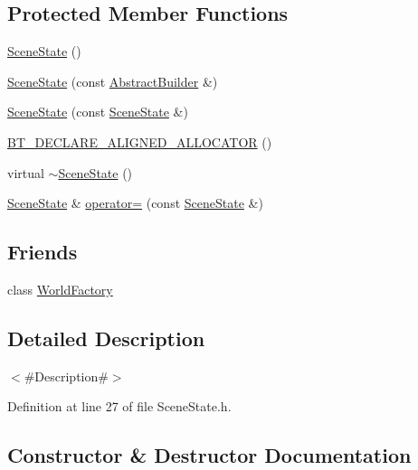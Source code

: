 \subsection*{Protected Member Functions}
\begin{DoxyCompactItemize}
\item 
\mbox{\hyperlink{classnjli_1_1_scene_state_a52f95093a613a2731c9e5af6d393d406}{Scene\+State}} ()
\item 
\mbox{\hyperlink{classnjli_1_1_scene_state_af36183061e329d8bee934b0102dcca1a}{Scene\+State}} (const \mbox{\hyperlink{classnjli_1_1_abstract_builder}{Abstract\+Builder}} \&)
\item 
\mbox{\hyperlink{classnjli_1_1_scene_state_ae224c0ca2d4499a7cfdabecf50f4191a}{Scene\+State}} (const \mbox{\hyperlink{classnjli_1_1_scene_state}{Scene\+State}} \&)
\item 
\mbox{\hyperlink{classnjli_1_1_scene_state_a10621b814c7eb3f151d1fb2def0de843}{B\+T\+\_\+\+D\+E\+C\+L\+A\+R\+E\+\_\+\+A\+L\+I\+G\+N\+E\+D\+\_\+\+A\+L\+L\+O\+C\+A\+T\+OR}} ()
\item 
virtual \mbox{\hyperlink{classnjli_1_1_scene_state_a7a162969f8688aca76d9f4524bdde614}{$\sim$\+Scene\+State}} ()
\item 
\mbox{\hyperlink{classnjli_1_1_scene_state}{Scene\+State}} \& \mbox{\hyperlink{classnjli_1_1_scene_state_a7ff08f27f08190fe52c335c6955582ac}{operator=}} (const \mbox{\hyperlink{classnjli_1_1_scene_state}{Scene\+State}} \&)
\end{DoxyCompactItemize}
\subsection*{Friends}
\begin{DoxyCompactItemize}
\item 
class \mbox{\hyperlink{classnjli_1_1_scene_state_acb96ebb09abe8f2a37a915a842babfac}{World\+Factory}}
\end{DoxyCompactItemize}


\subsection{Detailed Description}
$<$\#\+Description\#$>$ 

Definition at line 27 of file Scene\+State.\+h.



\subsection{Constructor \& Destructor Documentation}
\mbox{\label{classnjli_1_1_scene_state_a52f95093a613a2731c9e5af6d393d406}} 
